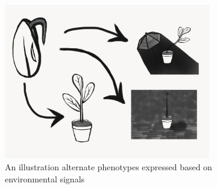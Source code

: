 \begin{figure} \label{figs/plant_developmental_perturbation}
  \includegraphics[width=0.8\textwidth]{img/plant_developmental_perturbation.jpg}
  \captionsetup{singlelinecheck=off,justification=raggedright}
  \caption{An illustration alternate phenotypes expressed based on environmental signals}
\end{figure}

